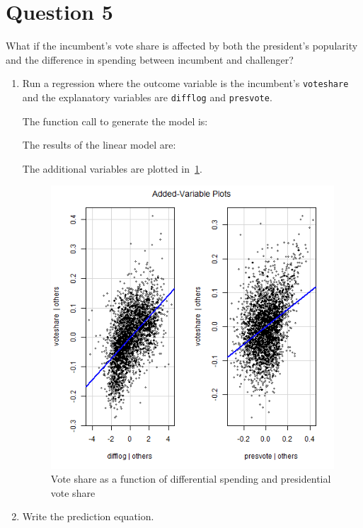 \documentclass[12pt,letterpaper]{article}
\begin{document}
	\newpage	

\section*{Question 5}
\noindent What if the incumbent's vote share is affected by both the president's popularity and the difference in spending between incumbent and challenger? 
	\begin{enumerate}
		\item Run a regression where the outcome variable is the incumbent's \texttt{voteshare} and the explanatory variables are \texttt{difflog} and \texttt{presvote}.	
		
  The function call to generate the model is:
	

	The results of the linear model are:
  

  The additional variables are plotted in~\ref{fig:add_var}.
	\begin{figure}
		  \includegraphics[width=1.0\textwidth]{Graphics/add_variable.png}
		  \caption{Vote share as a function of differential spending and presidential vote share}
		  \label{fig:add_var}
	\end{figure}


		\item Write the prediction equation.	\vspace{5cm}


\end{enumerate}
\end{document}
